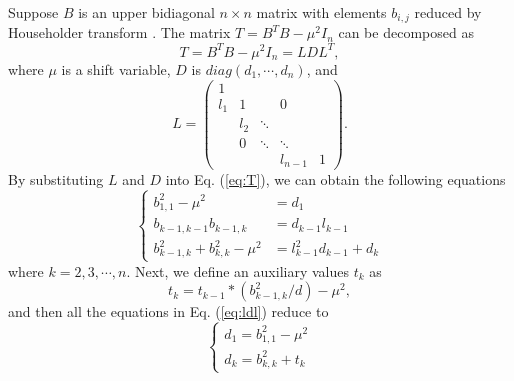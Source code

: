 Suppose $B$ is an upper bidiagonal $n \times n$ matrix with elements $b_{i,j}$ reduced by Householder transform \cite{10householder}.
The matrix $T = B^T B - \mu^2 I_n$ can be decomposed as
\begin{equation}
\label{eq:T}
T = B^T B - \mu^2 I_n = L D L^T ,
\end{equation}
where $\mu$ is a shift variable, $D$ is $diag(d_{1}, \cdots, d_{n})$, and 
\begin{equation}
 L =  \left( \begin{array}{ccccc}
     1&      &       &        &  \\
 l_{1}& 1    &       & 0      &  \\
      & l_{2}& \ddots&        &  \\
      & 0    & \ddots& \ddots &  \\
      &      &       & l_{n-1}& 1
\end{array} \right) .
\label{eq:l}
\end{equation}
By substituting $L$ and $D$ into Eq. (\ref{eq:T}), we can obtain the following equations
\begin{equation}
\left \{
\begin{aligned}
b_{1,1}^2 - \mu^2 &= d_1\\
b_{k-1,k-1} b_{k-1,k} &= d_{k-1} l_{k-1}\\
b_{k-1,k}^2 + b_{k,k}^2 - \mu^2 &= l_{k-1}^2 d_{k-1} + d_k
\end{aligned}
\right .
\label{eq:ldl}
\end{equation}
where $k = 2,3,\cdots,n$.
Next, we define an auxiliary values $t_{k}$ as
\begin{equation}
t_{k} = t_{k-1} * (b_{k-1,k}^2 / d) - \mu^2 ,
\label{eq:tmp}
\end{equation}
and then all the equations in Eq. (\ref{eq:ldl}) reduce to
\begin{equation}
\left \{
\begin{aligned}
d_1 = b_{1,1}^2 - \mu^2 \\
d_k = b_{k,k}^2 + t_{k}
\end{aligned}
\right .
\label{eq:negcount}
\end{equation}

